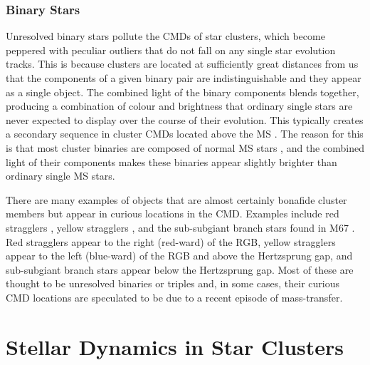 \subsubsection{Binary Stars}

Unresolved binary stars pollute the CMDs of star clusters, which 
become peppered with peculiar outliers that do not fall on any single 
star evolution tracks.  This is because clusters are located at
sufficiently great distances from us that the components of a given 
binary pair are indistinguishable and they appear as a single object.  
The combined light of the binary components blends together, producing a 
combination of colour and brightness that ordinary single stars are
never expected to display over the course of their
evolution.  This typically creates a secondary sequence in cluster CMDs
located above the MS \citep[e.g.][]{milone08}.  The reason for this is that
most cluster binaries are composed of normal MS stars 
\citep[e.g.][]{geller08}, and the combined 
light of their components makes these binaries appear slightly
brighter than ordinary single MS stars.

There are many examples of objects that are almost certainly bonafide
cluster members but appear in curious locations in the CMD.  Examples
include 
red stragglers \citep[e.g.][]{kaluzny03}, yellow stragglers
\citep[e.g.][]{latham05}, and 
the sub-subgiant branch stars found in M67 \citep{mathieu03}.  Red 
stragglers appear to the right (red-ward) of the RGB, yellow stragglers
appear to the left (blue-ward) of the RGB and above the Hertzsprung
gap, and sub-subgiant branch stars appear below the Hertzsprung gap.
Most of these are 
thought to be unresolved binaries or triples and, in some cases,
their curious CMD locations are speculated to be due to a recent
episode of mass-transfer.  

\section{Stellar Dynamics in Star Clusters} \label{dynamics_intro}

